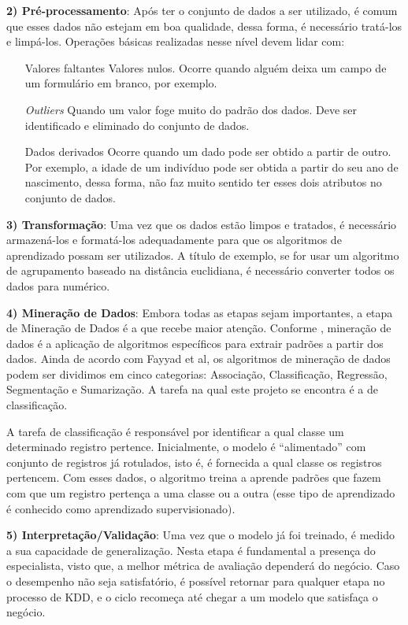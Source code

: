 \textbf{2) Pré-processamento}: Após ter o conjunto de dados a ser utilizado, é comum que esses dados não estejam em boa qualidade, dessa forma, é necessário tratá-los e limpá-los. Operações básicas realizadas nesse nível devem lidar com:

\begin{itemize}[leftmargin=1.2cm]
        \item [ Valores faltantes] Valores nulos. Ocorre quando alguém deixa um campo de um formulário em branco, por exemplo.
        \item [ \textit{Outliers}] Quando um valor foge muito do padrão dos dados. Deve ser identificado e eliminado do conjunto de dados.
        \item[ Dados derivados] Ocorre quando um dado pode ser obtido a partir de outro. Por exemplo, a idade de um indivíduo pode ser obtida a partir do seu ano de nascimento, dessa forma, não faz muito sentido ter esses dois atributos no conjunto de dados.
\end{itemize}

\textbf{3) Transformação}: Uma vez que os dados estão limpos e tratados, é necessário armazená-los e formatá-los adequadamente para que os algoritmos de aprendizado possam ser utilizados. A título de exemplo, se for usar um algoritmo de agrupamento baseado na distância euclidiana, é necessário converter todos os dados para numérico.

\textbf{4) Mineração de Dados}:  Embora todas as etapas sejam importantes, a etapa de Mineração de Dados é a que recebe maior atenção. Conforme \cite{fayyad:1996}, mineração de dados é a aplicação de algoritmos específicos para extrair padrões a partir dos dados. Ainda de acordo com Fayyad et al, os algoritmos de mineração de dados podem ser dividimos em cinco categorias: Associação, Classificação, Regressão, Segmentação e Sumarização. A tarefa na qual este projeto se encontra é a de classificação. 

A tarefa de classificação é responsável por identificar a qual classe um determinado registro pertence. Inicialmente, o modelo é ``alimentado'' com conjunto de registros já rotulados, isto é, é fornecida a qual classe os registros pertencem. Com esses dados, o algoritmo treina a aprende padrões que fazem com que um registro pertença a uma classe ou a outra
(esse tipo de aprendizado é conhecido como aprendizado supervisionado).


\textbf{5) Interpretação/Validação}: Uma vez que o modelo já foi treinado, é medido a sua capacidade de generalização. Nesta etapa é fundamental a presença do especialista, visto que, a melhor métrica de avaliação dependerá do negócio. Caso o desempenho não seja satisfatório, é possível retornar para qualquer etapa no processo de KDD, e o ciclo recomeça até chegar a um modelo que satisfaça o negócio.





